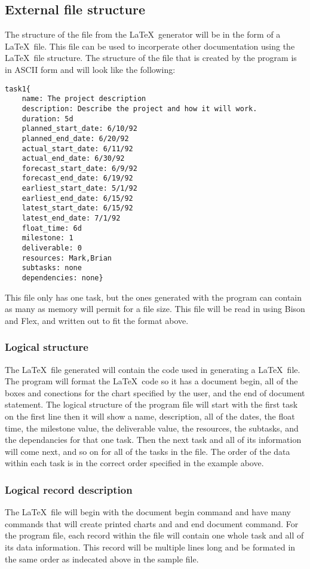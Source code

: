         \subsection{External file structure}
         The structure of the file from the \LaTeX\ generator will be in the form
of a \LaTeX\ file. This file can be used to incorperate other documentation using
the \LaTeX\ file structure. The structure of the file that is created by the
program is in ASCII form and will look like the following:
\begin{verbatim}
task1{
    name: The project description
    description: Describe the project and how it will work.
    duration: 5d
    planned_start_date: 6/10/92
    planned_end_date: 6/20/92
    actual_start_date: 6/11/92
    actual_end_date: 6/30/92
    forecast_start_date: 6/9/92
    forecast_end_date: 6/19/92
    earliest_start_date: 5/1/92
    earliest_end_date: 6/15/92
    latest_start_date: 6/15/92
    latest_end_date: 7/1/92
    float_time: 6d
    milestone: 1
    deliverable: 0
    resources: Mark,Brian
    subtasks: none
    dependencies: none}
\end{verbatim}
   This file only has one task, but the ones generated with the program can
contain as many as memory will permit for a file size. This file will
be read in using Bison and Flex, and written out to fit the format above.

               \subsubsection{Logical structure}
               The \LaTeX\ file generated will contain the code used in generating
a \LaTeX\ file. The program will format the \LaTeX\ code so it has a document begin,
all of the boxes and conections for the chart specified by the user, and the end
of document statement. The logical structure of the program file will start with
the first task on the first line then it will show a name, description, all of
the dates, the float time, the milestone value, the deliverable value, the
resources, the subtasks, and the dependancies for that one task. Then the next
task and all of its information will come next, and so on for all of the tasks
in the file. The order of the data within each task is in the correct order
specified in the example above.

                \subsubsection{Logical record description}
                The \LaTeX\ file will begin with the document begin command and
have many commands that will create printed charts and and end document command.
For the program file, each record within the file
will contain one whole task and all of its data information.  This record will
be multiple lines long and be formated in the same order as indecated above in
the sample file.

